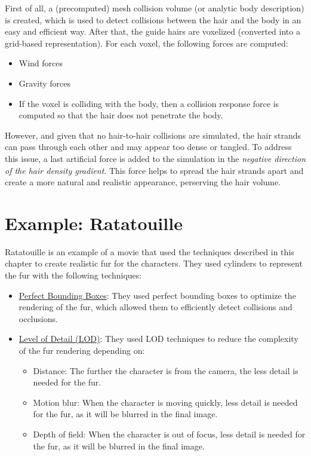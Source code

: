 First of all, a (precomputed) mesh collision volume (or analytic body description) is created, which is used to detect collisions between the hair and the body in an easy and efficient way. After that, the guide hairs are voxelized (converted into a grid-based representation). For each voxel, the following forces are computed:
\begin{itemize}
    \item Wind forces
    \item Gravity forces
    \item If the voxel is colliding with the body, then a collision response force is computed so that the hair does not penetrate the body.
\end{itemize}

However, and given that no hair-to-hair collisions are simulated, the hair strands can pass through each other and may appear too dense or tangled. To address this issue, a last artificial force is added to the simulation in the \emph{negative direction of the hair density gradient}. This force helps to spread the hair strands apart and create a more natural and realistic appearance, perserving the hair volume.


\section{Example: Ratatouille}

Ratatouille is an example of a movie that used the techniques described in this chapter to create realistic fur for the characters. They used cylinders to represent the fur with the following techniques:
\begin{itemize}
    \item \ul{Perfect Bounding Boxes}: They used perfect bounding boxes to optimize the rendering of the fur, which allowed them to efficiently detect collisions and occlusions.
    \item \ul{Level of Detail (LOD)}: They used LOD techniques to reduce the complexity of the fur rendering depending on:
    \begin{itemize}
        \item Distance: The further the character is from the camera, the less detail is needed for the fur.
        \item Motion blur: When the character is moving quickly, less detail is needed for the fur, as it will be blurred in the final image.
        \item Depth of field: When the character is out of focus, less detail is needed for the fur, as it will be blurred in the final image.
    \end{itemize}
\end{itemize}